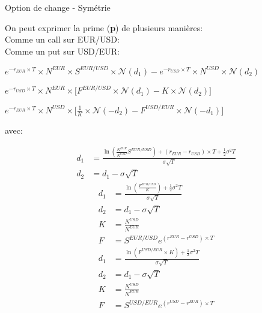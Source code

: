\documentclass{beamer}
\begin{document}
\begin{frame}{Option de change - Symétrie}
\begin{overprint}
On peut exprimer la prime (\textbf{p}) de plusieurs manières:\\
Comme un call sur EUR/USD:\\
Comme un put sur USD/EUR:\\
\end{overprint}
\vspace{0.5cm}
\begin{overprint}
\begin{center}
$e^{-r_{EUR} \times T} \times N^{EUR} \times S^{EUR/USD} \times \mathcal{N}(d_1)-e^{-r_{USD} \times T} \times N^{USD} \times \mathcal{N}(d_2)$
\end{center}
\begin{center}
$e^{-r_{USD} \times T} \times N^{EUR} \times \big[ F^{EUR/USD} \times \mathcal{N}(d_1)-K \times \mathcal{N}(d_2) \big]$
\end{center}
\begin{center}
$e^{-r_{EUR} \times T} \times N^{USD} \times \big[ \frac{1}{K} \times \mathcal{N}(-d_2)-F^{USD/EUR} \times \mathcal{N}(-d_1) \big]$
\end{center}
\end{overprint}
avec:\\
\begin{overprint}
\begin{align*}
d_1&=\frac{\ln\left( \frac{N^{EUR}}{N^{USD}} S^{EUR/USD} \right)+(r_{EUR}-r_{USD}) \times T+\frac{1}{2}\sigma^2 T}{\sigma\sqrt{T}}\\
d_2&=d_1-\sigma\sqrt{T}
\end{align*}
\begin{align*}
d_1&=\frac{\ln\left( \frac{F^{EUR/USD}}{K} \right) +\frac{1}{2}\sigma^2 T}{\sigma\sqrt{T}}\\
d_2&=d_1-\sigma\sqrt{T}\\
K&=\frac{N^{USD}}{N^{EUR}}\\
F&=S^{EUR/USD}e^{(r^{EUR}-r^{USD}) \times T}
\end{align*}
\begin{align*}
d_1&=\frac{\ln\left( F^{USD/EUR} \times K \right) +\frac{1}{2}\sigma^2 T}{\sigma\sqrt{T}}\\
d_2&=d_1-\sigma\sqrt{T}\\
K&=\frac{N^{USD}}{N^{EUR}}\\
F&=S^{USD/EUR}e^{(r^{USD}-r^{EUR}) \times T}
\end{align*}
\end{overprint}
\end{frame}
\end{document}
